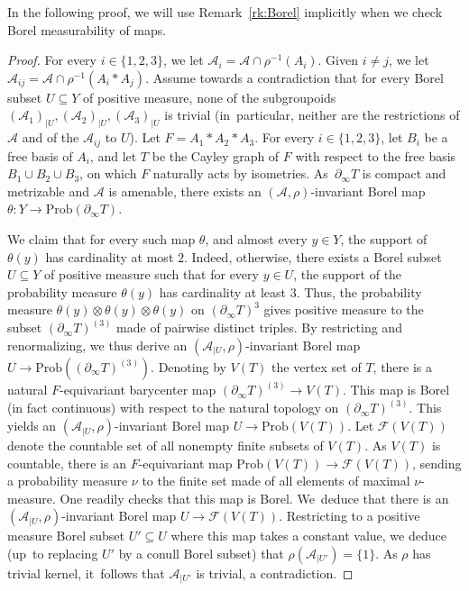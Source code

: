 \documentclass[JEP,XML,SOM,Unicode,NoFloatCountersInSection,published]{cedram}
\let\mathcal\mathscr
\theoremstyle{plain}
\theoremstyle{definition}
\newcommand{\cala}{\mathcal{A}}
\newcommand{\calf}{\mathcal{F}}
\newcommand{\Prob}{\mathrm{Prob}}
\begin{document}
In the following proof, we will use Remark~\ref{rk:Borel} implicitly when we check Borel measurability of maps.

\begin{proof}
For every $i\in\{1,2,3\}$, we let $\cala_i=\cala\cap\rho^{-1}(A_i)$. Given $i\neq j$, we let $\cala_{ij}=\cala\cap\rho^{-1}(A_i\ast A_j)$. Assume towards a contradiction that for every Borel subset $U\subseteq Y$ of positive measure, none of the subgroupoids $(\cala_1)_{|U},(\cala_2)_{|U},(\cala_3)_{|U}$ is trivial (in~par\-ticular, neither are the restrictions of $\cala$ and of the $\cala_{ij}$ to $U$). Let $F=A_1\ast A_2\ast A_3$. For every $i\in\{1,2,3\}$, let $B_i$ be a free basis of $A_i$, and let $T$ be the Cayley graph of $F$ with respect to the free basis $B_1\cup B_2\cup B_3$, on which $F$ naturally acts by isometries. As~$\partial_\infty T$ is compact and metrizable and $\cala$ is amenable, there exists an $(\cala,\rho)$-invariant Borel map $\theta:Y\to \Prob(\partial_\infty T)$.

We claim that for every such map $\theta$, and almost every $y\in Y$, the support of $\theta(y)$ has cardinality at most $2$. Indeed, otherwise, there exists a Borel subset $U\subseteq Y$ of positive measure such that for every $y\in U$, the support of the probability measure $\theta(y)$ has cardinality at least $3$. Thus, the probability measure $\theta(y)\otimes\theta(y)\otimes\theta(y)$ on $(\partial_\infty T)^3$ gives positive measure to the subset $(\partial_\infty T)^{(3)}$ made of pairwise distinct triples. By restricting and renormalizing, we thus derive an $(\cala_{|U},\rho)$-invariant Borel map $U\to\Prob((\partial_\infty T)^{(3)})$. Denoting by $V(T)$ the vertex set of $T$, there is a natural $F$-equivariant barycenter map $(\partial_\infty T)^{(3)}\to V(T)$. This map is Borel (in fact continuous) with respect to the natural topology on $(\partial_\infty T)^{(3)}$. This yields an $(\cala_{|U},\rho)$-invariant Borel map $U\to\Prob(V(T))$. Let $\calf(V(T))$ denote the countable set of all nonempty finite subsets of $V(T)$. As $V(T)$ is countable, there is an $F$-equivariant map $\Prob(V(T))\to\calf(V(T))$, sending a probability measure $\nu$ to the finite set made of all elements of maximal $\nu$-measure. One readily checks that this map is Borel. We~deduce that there is an $(\cala_{|U},\rho)$-invariant Borel map $U\to\calf(V(T))$. Restricting to a positive measure Borel subset $U'\subseteq U$ where this map takes a constant value, we deduce (up~to replacing $U'$ by a conull Borel subset) that $\rho(\cala_{|U'})=\{1\}$. As $\rho$ has trivial kernel, it~follows that $\cala_{|U'}$ is trivial, a contradiction.


\end{proof}
\end{document}
